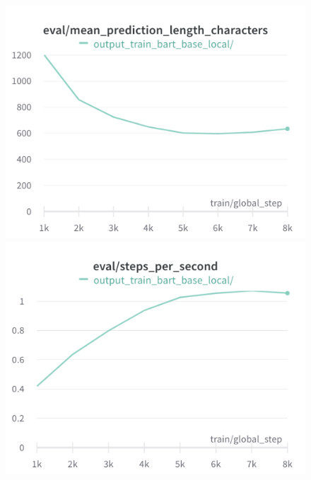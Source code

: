 \begin{figure}[!htb]
\includegraphics[width=\linewidth]{wandb/charts/Section-4-Panel-0-mbqkjnm1l}
\caption{}
\endminipage\hfill
{}
\includegraphics[width=\linewidth]{wandb/charts/Section-4-Panel-1-rouuz3suq}
\caption{}
\endminipage
\end{figure}

